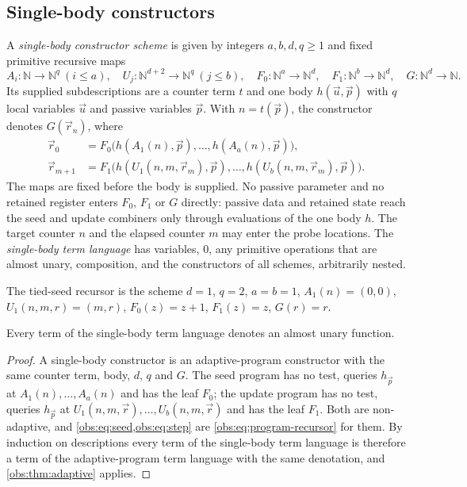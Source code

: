 \subsection{Single-body constructors}

\begin{definition}
\label{obs:def:single-body}
A \emph{single-body constructor scheme} is given by integers $a,b,d,q\ge 1$ and
fixed primitive recursive maps
\[
A_i\colon\mathbb{N}\to\mathbb{N}^q\ (i\le a),\quad
U_j\colon\mathbb{N}^{d+2}\to\mathbb{N}^q\ (j\le b),\quad
F_0\colon\mathbb{N}^a\to\mathbb{N}^d,\quad
F_1\colon\mathbb{N}^b\to\mathbb{N}^d,\quad
G\colon\mathbb{N}^d\to\mathbb{N}.
\]
Its supplied subdescriptions are a counter term $t$ and one body
$h(\vec u,\vec p)$ with $q$ local variables $\vec u$ and passive variables
$\vec p$. With $n=t(\vec p)$, the constructor denotes $G(\vec r_n)$, where
\begin{align}
\vec r_0&=F_0\bigl(h(A_1(n),\vec p),\dots,h(A_a(n),\vec p)\bigr),\label{obs:eq:seed}\\
\vec r_{m+1}&=F_1\bigl(h(U_1(n,m,\vec r_m),\vec p),\dots,h(U_b(n,m,\vec r_m),\vec p)\bigr).\label{obs:eq:step}
\end{align}
The maps are fixed before the body is supplied. No passive parameter and no
retained register enters $F_0$, $F_1$ or $G$ directly: passive data and
retained state reach the seed and update combiners only through evaluations of
the one body $h$. The target counter $n$ and the elapsed counter $m$ may enter
the probe locations. The \emph{single-body term language} has variables, $0$,
any primitive operations that are almost unary, composition, and the
constructors of all schemes, arbitrarily nested.
\end{definition}

The tied-seed recursor is the scheme $d=1$, $q=2$, $a=b=1$, $A_1(n)=(0,0)$,
$U_1(n,m,r)=(m,r)$, $F_0(z)=z+1$, $F_1(z)=z$, $G(r)=r$.

\begin{theorem}
\label{obs:thm:single-body}
Every term of the single-body term language denotes an almost unary function.
\end{theorem}

\begin{proof}
A single-body constructor is an adaptive-program constructor with the same
counter term, body, $d$, $q$ and $G$. The seed program has no test, queries
$h_{\vec p}$ at $A_1(n),\dots,A_a(n)$ and has the leaf $F_0$; the update program
has no test, queries $h_{\vec p}$ at $U_1(n,m,\vec r),\dots,U_b(n,m,\vec r)$
and has the leaf $F_1$. Both are non-adaptive, and
\cref{obs:eq:seed,obs:eq:step} are \cref{obs:eq:program-recursor} for them. By
induction on descriptions every term of the single-body term language is
therefore a term of the adaptive-program term language with the same
denotation, and \cref{obs:thm:adaptive} applies.
\end{proof}

